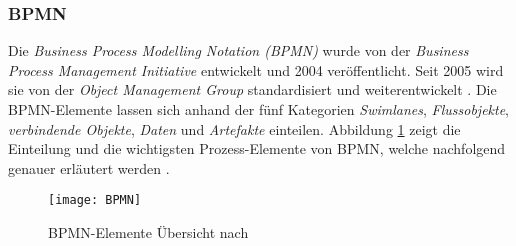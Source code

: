 \subsubsection {BPMN}

Die \textit{Business Process Modelling Notation (BPMN)} wurde von der \textit{Business Process Management Initiative} entwickelt und 2004 veröffentlicht. Seit 2005 wird sie von der \textit{Object Management Group} standardisiert und weiterentwickelt \cite{krallmann2013}.
Die BPMN-Elemente lassen sich anhand der fünf Kategorien \textit{Swimlanes}, \textit{Flussobjekte}, \textit{verbindende Objekte}, \textit{Daten} und \textit{Artefakte} einteilen. Abbildung \ref{fig:BPMN} zeigt die Einteilung und die wichtigsten Prozess-Elemente von BPMN, welche nachfolgend genauer erläutert werden \cite{gpfert2012}. \newline

\begin{figure}[htp]
\begin{center}
  \texttt{[image: BPMN]} %
  \caption{BPMN-Elemente Übersicht nach \cite{gpfert2012}}
  \label{fig:BPMN}
\end{center}
\end{figure}

